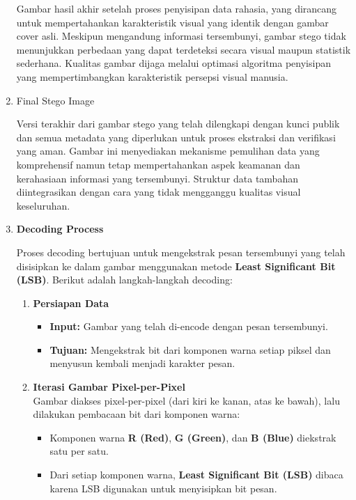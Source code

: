 \documentclass{ittelkom}
\begin{document}
\begin{enumerate}
          Gambar hasil akhir setelah proses penyisipan data rahasia, yang dirancang untuk
          mempertahankan karakteristik visual yang identik dengan gambar cover asli.
          Meskipun mengandung informasi tersembunyi, gambar stego tidak menunjukkan
          perbedaan yang dapat terdeteksi secara visual maupun statistik sederhana.
          Kualitas gambar dijaga melalui optimasi algoritma penyisipan yang
          mempertimbangkan karakteristik persepsi visual manusia.

    \item Final Stego Image

          Versi terakhir dari gambar stego yang telah dilengkapi dengan kunci publik dan
          semua metadata yang diperlukan untuk proses ekstraksi dan verifikasi yang aman.
          Gambar ini menyediakan mekanisme pemulihan data yang komprehensif namun tetap
          mempertahankan aspek keamanan dan kerahasiaan informasi yang tersembunyi.
          Struktur data tambahan diintegrasikan dengan cara yang tidak mengganggu
          kualitas visual keseluruhan.
    \item \textbf{Decoding Process}

          Proses decoding bertujuan untuk mengekstrak pesan tersembunyi yang telah
          disisipkan ke dalam gambar menggunakan metode \textbf{Least Significant Bit
              (LSB)}. Berikut adalah langkah-langkah decoding:

          \begin{enumerate}
              \item \textbf{Persiapan Data}
                    \begin{itemize}
                        \item \textbf{Input:} Gambar yang telah di-encode dengan pesan tersembunyi.
                        \item \textbf{Tujuan:} Mengekstrak bit dari komponen warna setiap piksel dan menyusun kembali menjadi karakter pesan.
                    \end{itemize}

              \item \textbf{Iterasi Gambar Pixel-per-Pixel} \\
                    Gambar diakses pixel-per-pixel (dari kiri ke kanan, atas ke bawah), lalu dilakukan pembacaan bit dari komponen warna:
                    \begin{itemize}
                        \item Komponen warna \textbf{R (Red)}, \textbf{G (Green)}, dan \textbf{B (Blue)}
                              diekstrak satu per satu.
                        \item Dari setiap komponen warna, \textbf{Least Significant Bit (LSB)} dibaca karena
                              LSB digunakan untuk menyisipkan bit pesan.
                    \end{itemize}


\end{enumerate}
\end{enumerate}
\end{document}
